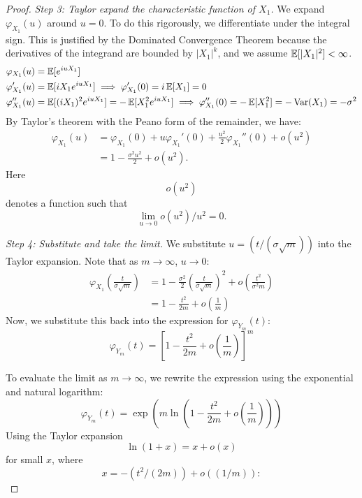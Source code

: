 \begin{proof}
\textit{Step 3: Taylor expand the characteristic function of $X_1$.}
We expand $\varphi_{X_1}(u)$ around $u=0$. To do this rigorously, we differentiate under the integral sign. This is justified by the Dominated Convergence Theorem because the derivatives of the integrand are bounded by $|X_1|^k$, and we assume $\operatorname{\mathbb{E}}[|X_1|^2] < \infty$.
\begin{align*}
\varphi_{X_1}(u) &= \operatorname{\mathbb{E}}[e^{iuX_1}] \\
    \varphi_{X_1}'(u) &= \operatorname{\mathbb{E}}[iX_1 e^{iuX_1}] \implies \varphi_{X_1}'(0) = i\operatorname{\mathbb{E}}[X_1] = 0 \\
    \varphi_{X_1}''(u) &= \operatorname{\mathbb{E}}[(iX_1)^2 e^{iuX_1}] = -\operatorname{\mathbb{E}}[X_1^2 e^{iuX_1}] \implies \varphi_{X_1}''(0) = -\operatorname{\mathbb{E}}[X_1^2] = -\operatorname{Var}(X_1) = -\sigma^2
\end{align*}
By Taylor's theorem with the Peano form of the remainder, we have:
\begin{equation}
\begin{aligned}
\varphi_{X_1}(u) &= \varphi_{X_1}(0) + u\varphi_{X_1}'(0) + \frac{u^2}{2}\varphi_{X_1}''(0) + o(u^2) \\
&= 1 - \frac{\sigma^2 u^2}{2} + o(u^2).
\end{aligned}
\end{equation}
Here
\[
o(u^2)
\]
 denotes a function such that
\[
\lim_{u \to 0} o(u^2)/u^2 = 0.
\]

\textit{Step 4: Substitute and take the limit.}
We substitute $u = (t/(\sigma\sqrt{m}))$ into the Taylor expansion. Note that as $m \to \infty$, $u \to 0$:
\begin{equation}
\begin{aligned}
\varphi_{X_1}\left( \frac{t}{\sigma\sqrt{m}} \right) &= 1 - \frac{\sigma^2}{2} \left( \frac{t}{\sigma\sqrt{m}} \right)^2 + o\left( \frac{t^2}{\sigma^2 m} \right) \\
&= 1 - \frac{t^2}{2m} + o\left( \frac{1}{m} \right)
\end{aligned}
\end{equation}
Now, we substitute this back into the expression for $\varphi_{Y_m}(t)$:
\begin{equation}
\varphi_{Y_m}(t) = \left[ 1 - \frac{t^2}{2m} + o\left( \frac{1}{m} \right) \right]^m
\end{equation}

To evaluate the limit as $m \to \infty$, we rewrite the expression using the exponential and natural logarithm:
\begin{equation}
\varphi_{Y_m}(t) = \exp\left( m \ln\left( 1 - \frac{t^2}{2m} + o\left( \frac{1}{m} \right) \right) \right)
\end{equation}
Using the Taylor expansion
\[
\ln(1 + x) = x + o(x)
\]
 for small $x$, where
\[
x = -(t^2/(2m)) + o( (1/m) ):
\]


\end{proof}
